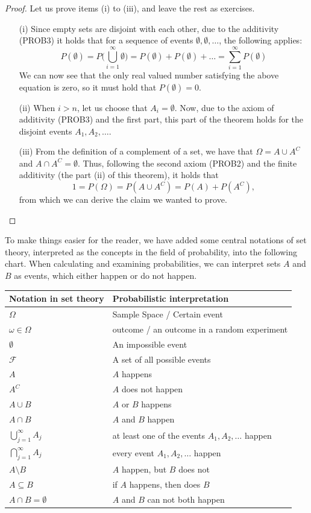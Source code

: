 \documentclass[12pt,a4paper,leqno]{report}
\newcommand{\F}{\mathcal{F}}
\theoremstyle{plain}
\theoremstyle{definition}
\begin{document}
\begin{proof} Let us prove items (i) to (iii), and leave the rest as exercises.
\begin{itemize}
\item[(i)] Since empty sets are disjoint with each other, due to the additivity (PROB3) it holds that for a sequence of events $\emptyset, \emptyset, \dots$, the following applies:
\[
P(\emptyset) = P\Big(\bigcup_{i=1}^\infty \emptyset\Big) = P(\emptyset) + P(\emptyset)+ \dots = \sum_{i=1}^\infty P(\emptyset)
\]
We can now see that the only real valued number satisfying the above equation is zero, so it must hold that $P(\emptyset) = 0.$ 

\item[(ii)] When $i > n$, let us choose that $A_i = \emptyset$. Now, due to the axiom of additivity (PROB3) and the first part, this part of the theorem holds for the disjoint events $A_1, A_2,  \dots$. 
\item[(iii)] From the definition of a complement of a set, we have that $\Omega = A \cup A^C$ and $A \cap A^C = \emptyset$. Thus, following the second axiom (PROB2) and the finite additivity (the part (ii) of this theorem), it holds that
\[
1 = P(\Omega) = P(A \cup A^C) = P(A) + P(A^C),
\]
from which we can derive the claim we wanted to prove.
\end{itemize}
\end{proof}

To make things easier for the reader, we have added some central notations of set theory, interpreted as the concepts in the field of probability, into the following chart. When calculating and examining probabilities, we can interpret sets $A$ and $B$ as events, which either happen or do not happen.

\bigskip

\begin{tabular}{l l }
\toprule
Notation in set theory & Probabilistic interpretation \\
\midrule
$\Omega$ & Sample Space / Certain event \\
$\omega \in \Omega$ & outcome / an outcome in a random experiment \\
$\emptyset$ & An impossible event \\
$\F$ & A set of all possible events \\
$A$ & $A$ happens\\
$A^C$ & $A$ does not happen \\
$A \cup B$ & $A$ or $B$ happens\\
$A \cap B$ & $A$ and $B$ happen \\
$\bigcup_{j=1}^\infty A_j$ & at least one of the events $A_1, A_2, \dots$ happen \\
$\bigcap_{j=1}^\infty A_j$ & every event $A_1, A_2, \dots$ happen \\
$A \setminus B$ & $A$ happen, but $B$ does not\\
$A \subseteq B$ & if $A$ happens, then does $B$\\
$A \cap B = \emptyset$ &  $A$ and $B$ can not both happen\\
\bottomrule 
\end{tabular}
\bigskip
\bigskip
\end{document}
